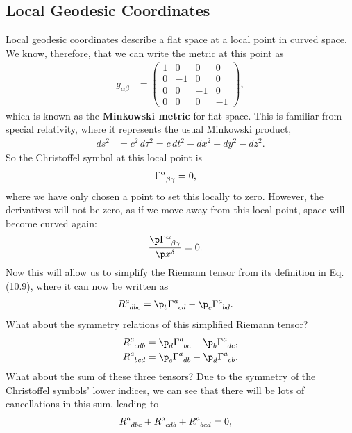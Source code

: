 \documentclass[a4paper, 11pt, normalem]{report}
\begin{document}
\subsection{Local Geodesic Coordinates}
Local geodesic coordinates describe a flat space at a local point in curved space.
We know, therefore, that we can write the metric at this point as
\begin{align}
    g_{\alpha\beta} &= \begin{pmatrix} 1 & 0 & 0 & 0 \\ 0 & -1 & 0 & 0 \\ 0 & 0 & -1 & 0 \\ 0 & 0 & 0 & -1 \end{pmatrix},
\end{align}
which is known as the \textbf{Minkowski metric} for flat space.
This is familiar from special relativity, where it represents the usual Minkowski product,
\begin{align}
    ds^2 &= c^2\,d\tau^2 = c\,dt^2 - dx^2 - dy^2 - dz^2.
\end{align}
So the Christoffel symbol at this local point is
\begin{align}
    \tensor{\Gamma}{^\alpha_{\beta\gamma}} &= 0,
\end{align}
where we have only chosen a point to set this locally to zero.
However, the derivatives will not be zero, as if we move away from this local point, space will become curved again:
\begin{align}
    \frac{\p\tensor{\Gamma}{^\alpha_{\beta\gamma}}}{\p x^\delta} &= 0.
\end{align}
Now this will allow us to simplify the Riemann tensor from its definition in Eq. (10.9), where it can now be written as
\begin{align}
    \tensor{R}{^a_{dbc}} &= \p_b\tensor{\Gamma}{^a_{cd}} - \p_c\tensor{\Gamma}{^a_{bd}}.
\end{align}
What about the symmetry relations of this simplified Riemann tensor?
\begin{align}
    \tensor{R}{^a_{cdb}} &= \p_d\tensor{\Gamma}{^a_{bc}} - \p_b\tensor{\Gamma}{^a_{dc}}, \\
    \tensor{R}{^a_{bcd}} &= \p_c\tensor{\Gamma}{^a_{db}} - \p_d\tensor{\Gamma}{^a_{cb}}.
\end{align}
What about the sum of these three tensors?
Due to the symmetry of the Christoffel symbols' lower indices, we can see that there will be lots of cancellations in this sum, leading to
\begin{align}
    \tensor{R}{^a_{dbc}} + \tensor{R}{^a_{cdb}} + \tensor{R}{^a_{bcd}} &= 0,
\end{align}
\end{document}
